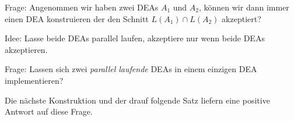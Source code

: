 %                 

Frage: Angenommen wir haben zwei \ac{DEA}s $A_1$ und $A_2$, können wir dann immer einen \ac{DEA} konstruieren der den Schnitt $L(A_1)\cap L(A_2)$ akzeptiert?

Idee: Lasse beide \ac{DEA}s parallel laufen, akzeptiere nur wenn beide \ac{DEA}s akzeptieren.

Frage: Lassen sich zwei \emph{parallel laufende} \ac{DEA}s in einem einzigen \ac{DEA} implementieren?

Die nächste Konstruktion und der drauf folgende Satz liefern eine positive Antwort auf diese Frage.

